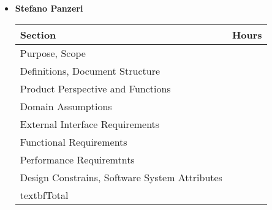 \begin{itemize}
\item \textbf{Stefano Panzeri}

\begin{table}[!h]
\begin{tabular}{|l|l|}
\hline
 \textbf{Section}														&		\textbf{Hours}  \\ \hline
Purpose, Scope														&  	\\ \hline
Definitions, Document Structure							&  	\\ \hline
Product Perspective and Functions						&  	\\ \hline
Domain Assumptions												&  	\\ \hline
External Interface Requirements							&  	\\ \hline
Functional Requirements										&  	\\ \hline
Performance Requiremtnts									&  	\\ \hline
Design Constrains, Software System Attributes	&  	\\ \hline
textbf{Total}															&  	\\ \hline
\end{tabular}
\end{table}


\end{itemize}
